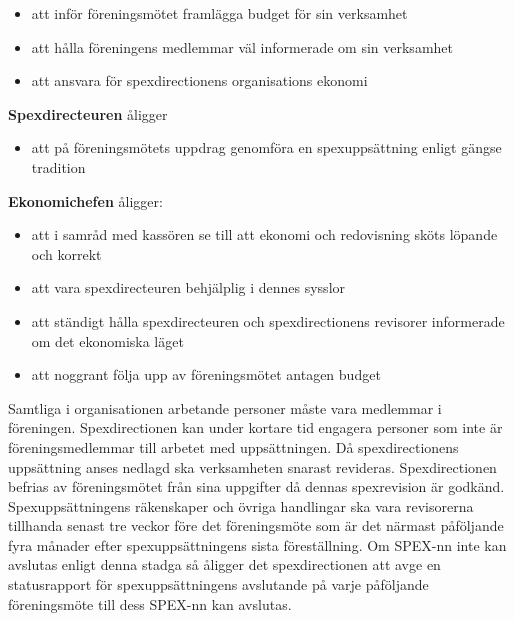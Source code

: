 \documentclass[a4paper]{article}
\begin{document}
\begin{itemize}
  \item att inför föreningsmötet framlägga budget för sin verksamhet
  \item att hålla föreningens medlemmar väl informerade om sin verksamhet
  \item att ansvara för spexdirectionens organisations ekonomi
\end{itemize}

\noindent
\textbf{Spexdirecteuren} åligger

\begin{itemize}
  \item att på föreningsmötets uppdrag genomföra en spexuppsättning enligt gängse tradition
\end{itemize}

\noindent
\textbf{Ekonomichefen} åligger:

\begin{itemize}
  \item att i samråd med kassören se till att ekonomi och redovisning sköts löpande och korrekt
  \item att vara spexdirecteuren behjälplig i dennes sysslor
  \item att ständigt hålla spexdirecteuren och spexdirectionens revisorer informerade om det ekonomiska läget
  \item att noggrant följa upp av föreningsmötet antagen budget
\end{itemize}

\noindent
Samtliga i organisationen arbetande personer måste vara medlemmar i föreningen. Spexdirectionen kan under kortare tid engagera personer som inte är föreningsmedlemmar till arbetet med uppsättningen.\newline
\newline
Då spexdirectionens uppsättning anses nedlagd ska verksamheten snarast revideras. Spexdirectionen befrias av föreningsmötet från sina uppgifter då dennas spexrevision är godkänd.\newline
\newline
Spexuppsättningens räkenskaper och övriga handlingar ska vara revisorerna tillhanda senast tre veckor före det föreningsmöte som är det närmast påföljande fyra månader efter spexuppsättningens sista föreställning.\newline
\newline
Om SPEX-nn inte kan avslutas enligt denna stadga så åligger det spexdirectionen att avge en statusrapport för spexuppsättningens avslutande på varje påföljande föreningsmöte till dess SPEX-nn kan avslutas.
\end{document}
